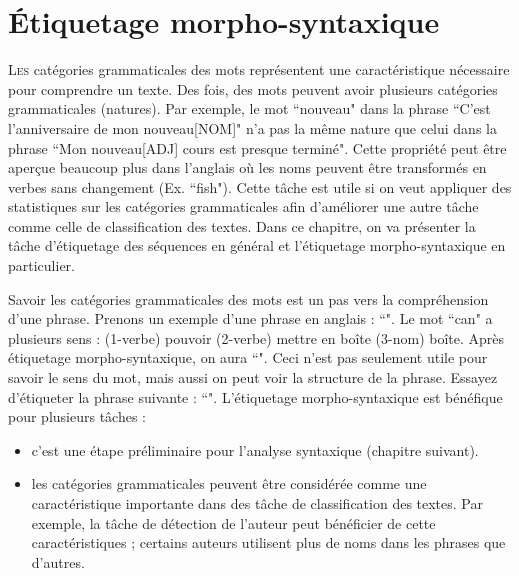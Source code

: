\documentclass{KodeBook}
\begin{document}
		\mainmatter
	
\fi
\chapter{Étiquetage morpho-syntaxique}

\begin{introduction}
	\lettrine{L}{es} catégories grammaticales des mots représentent une caractéristique nécessaire pour comprendre un texte. 
	Des fois, des mots peuvent avoir plusieurs catégories grammaticales (natures). 
	Par exemple, le mot ``nouveau" dans la phrase ``C'est l'anniversaire de mon nouveau[NOM]" n'a pas la même nature que celui dans la phrase ``Mon nouveau[ADJ] cours est presque terminé". 
	Cette propriété peut être aperçue beaucoup plus dans l'anglais où les noms peuvent être transformés en verbes sans changement (Ex. ``fish"). 
	Cette tâche est utile si on veut appliquer des statistiques sur les catégories grammaticales afin d'améliorer une autre tâche comme celle de classification des textes. 
	Dans ce chapitre, on va présenter la tâche d'étiquetage des séquences en général et l'étiquetage morpho-syntaxique en particulier.
\end{introduction} 

Savoir les catégories grammaticales des mots est un pas vers la compréhension d'une phrase.
Prenons un exemple d'une phrase en anglais : ``". 
Le mot ``can" a plusieurs sens : (1-verbe) pouvoir (2-verbe) mettre en boîte (3-nom) boîte.
Après étiquetage morpho-syntaxique, on aura ``".
Ceci n'est pas seulement utile pour savoir le sens du mot, mais aussi on peut voir la structure de la phrase.
Essayez d'étiqueter la phrase suivante : ``".
L'étiquetage morpho-syntaxique est bénéfique pour plusieurs tâches :
\begin{itemize}
	\item c'est une étape préliminaire pour l'analyse syntaxique (chapitre suivant).
	\item les catégories grammaticales peuvent être considérée comme une caractéristique importante dans des tâche de classification des textes. 
	Par exemple, la tâche de détection de l'auteur peut bénéficier de cette caractéristiques ; certains auteurs utilisent plus de noms dans les phrases que d'autres.
\end{itemize}
\end{document}
